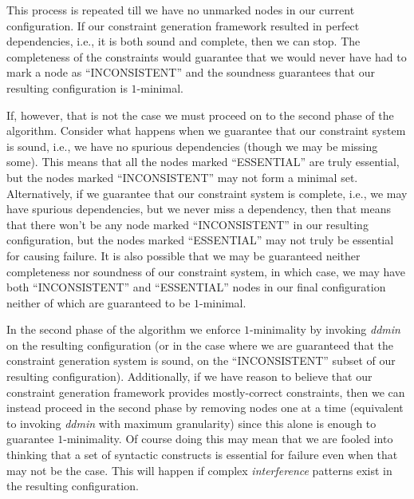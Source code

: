 \documentclass[preprint]{acm_proc_article-sp}
\begin{document}
This process is repeated till we have no unmarked nodes in our current
configuration. If our constraint generation framework resulted in perfect
dependencies, i.e., it is both sound and complete, then we can stop. The
completeness of the constraints would guarantee that we would never have had to
mark a node as ``INCONSISTENT'' and the soundness guarantees that our resulting
configuration is $1$-minimal.

If, however, that is not the case we must proceed on to the second phase of the
algorithm. Consider what happens when we guarantee that our constraint system is
sound, i.e., we have no spurious dependencies (though we may be missing some).
This means that all the nodes marked ``ESSENTIAL'' are truly essential, but the
nodes marked ``INCONSISTENT'' may not form a minimal set. Alternatively, if we
guarantee that our constraint system is complete, i.e., we may have spurious
dependencies, but we never miss a dependency, then that means that there won't
be any node marked ``INCONSISTENT'' in our resulting configuration, but the
nodes marked ``ESSENTIAL'' may not truly be essential for causing failure. It is
also possible that we may be guaranteed neither completeness nor soundness of
our constraint system, in which case, we may have both ``INCONSISTENT'' and
``ESSENTIAL'' nodes in our final configuration neither of which are guaranteed
to be $1$-minimal.

In the second phase of the algorithm we enforce $1$-minimality by invoking
\emph{ddmin} \citep{dd} on the resulting configuration (or in the case where we
are guaranteed that the constraint generation system is sound, on the
``INCONSISTENT'' subset of our resulting configuration). Additionally, if we
have reason to believe that our constraint generation framework provides
mostly-correct constraints, then we can instead proceed in the second phase by
removing nodes one at a time (equivalent to invoking \emph{ddmin} with maximum
granularity) since this alone is enough to guarantee $1$-minimality. Of course
doing this may mean that we are fooled into thinking that a set of syntactic
constructs is essential for failure even when that may not be the case. This
will happen if complex \emph{interference} patterns \cite{zeller99} exist in the
resulting configuration.

\end{document}
